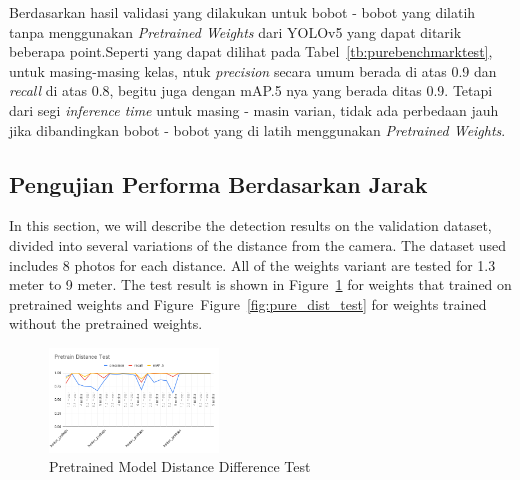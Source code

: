 
\par Berdasarkan hasil validasi yang dilakukan untuk bobot - bobot yang dilatih tanpa menggunakan \emph{Pretrained Weights} dari YOLOv5 yang dapat ditarik beberapa point.Seperti yang dapat dilihat pada Tabel~\ref{tb:purebenchmarktest}, untuk masing-masing kelas, ntuk \emph{precision} secara umum berada di atas 0.9 dan \emph{recall} di atas 0.8, begitu juga dengan mAP.5 nya yang berada ditas 0.9. Tetapi dari segi \emph{inference time} untuk masing - masin varian, tidak ada perbedaan jauh jika dibandingkan bobot - bobot yang di latih menggunakan \emph{Pretrained Weights}.

\subsection{Pengujian Performa Berdasarkan Jarak}
\label{subsec:model_rangetest}

\par In this section, we will describe the detection results on the validation dataset, divided into several variations of the distance from the camera. The dataset used includes 8 photos for each distance. All of the weights variant are tested for 1.3 meter to 9 meter. The test result is shown in Figure~\ref{fig:pretrain_dist_test} for weights that trained on pretrained weights and Figure~Figure~\ref{fig:pure_dist_test} for weights trained without the pretrained weights.
 
\begin{figure}[ht]
  \centering
  \includegraphics[width=0.4\textwidth]{gambar/utilities/pretain_dist_test.png}
  \caption{Pretrained Model Distance Difference Test}
  \label{fig:pretrain_dist_test}  
\end{figure}

